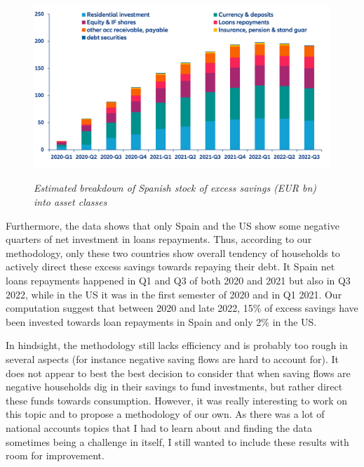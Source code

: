 \begin{figure}[H]
    \centering
    \caption{\textit{Estimated breakdown of Spanish stock of excess savings (EUR bn) into asset classes}}
    \includegraphics[width=.8\textwidth]{Core/1.Savings/img/xSpainAL.png}
    \label{figure:SpainAL}
\end{figure}
Furthermore, the data shows that only Spain and the US show some negative quarters of net investment in loans repayments. Thus, according to our methodology, only these two countries show overall tendency of households to actively direct these excess savings towards repaying their debt. It Spain net loans repayments happened in Q1 and Q3 of both 2020 and 2021 but also in Q3 2022, while in the US it was in the first semester of 2020 and in Q1 2021. Our computation suggest that between 2020 and late 2022, 15\% of excess savings have been invested towards loan repayments in Spain and only 2\% in the US.

In hindsight, the methodology still lacks efficiency and is probably too rough in several aspects (for instance negative saving flows are hard to account for). It does not appear to best the best decision to consider that when saving flows are negative households dig in their savings to fund investments, but rather direct these funds towards consumption. 
However, it was really interesting to work on this topic and to propose a methodology of our own. As there was a lot of national accounts topics that I had to learn about and finding the data sometimes being a challenge in itself, I still wanted to include these results with room for improvement.

